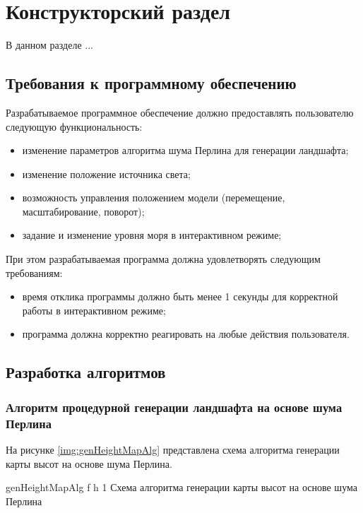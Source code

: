\chapter{Конструкторский раздел}

В данном разделе ...

\section{Требования к программному обеспечению}

Разрабатываемое программное обеспечение должно предоставлять пользователю следующую функциональность:

\begin{itemize}[label=--]
	\item изменение параметров алгоритма шума Перлина для генерации ландшафта;
	\item изменение положение источника света;
	\item возможность управления положением модели (перемещение, масштабирование, поворот);
	\item задание и изменение уровня моря в интерактивном режиме;
\end{itemize}

При этом разрабатываемая программа должна удовлетворять следующим требованиям:

\begin{itemize}[label=--]
	\item время отклика программы должно быть менее 1 секунды для корректной работы в интерактивном режиме;
	\item программа должна корректно реагировать на любые действия пользователя.
\end{itemize}

\section{Разработка алгоритмов}


\subsection{Алгоритм процедурной генерации ландшафта на основе шума Перлина}

На рисунке \ref{img:genHeightMapAlg} представлена схема алгоритма генерации карты высот на основе шума Перлина.

{genHeightMapAlg} %
{f} %
{h} %
{1\textwidth} %
{Схема алгоритма генерации карты высот на основе шума Перлина} %

